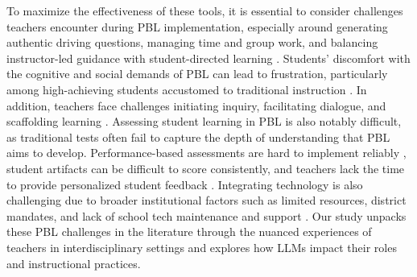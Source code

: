 To maximize the effectiveness of these tools, it is essential to consider challenges teachers encounter during PBL implementation, especially around generating authentic driving questions, 
managing time and group work, and balancing instructor-led guidance with student-directed learning \cite{zheng2024charting, thomas2010review, mergendoller2005managing}. 
Students’ discomfort with the cognitive and social demands of PBL can lead to frustration, particularly among high-achieving students accustomed to traditional instruction \cite{condliffe2017project}. In addition, teachers face challenges initiating inquiry, facilitating dialogue, and scaffolding learning \cite{reiser2006making, kali2008technology, krajcik2014promises, quintana2018scaffolding, reiser2018scaffolding}. 
Assessing student learning in PBL is also notably difficult, as traditional tests often fail to capture the depth of understanding that PBL aims to develop.  %
Performance-based assessments are hard to implement reliably \cite{hertzog2007transporting, mergendoller2005managing, darling2010beyond, aslan2015examining}, student artifacts can be difficult to score consistently, and teachers lack the time to provide personalized student feedback \cite{hattie2011instruction}. %
Integrating technology is also challenging due to broader institutional factors such as limited resources, district mandates, and lack of school tech maintenance and support \cite{zheng2024charting}. Our study unpacks these PBL challenges in the literature through the nuanced experiences of teachers in interdisciplinary settings and explores how LLMs impact their roles and instructional practices. 



